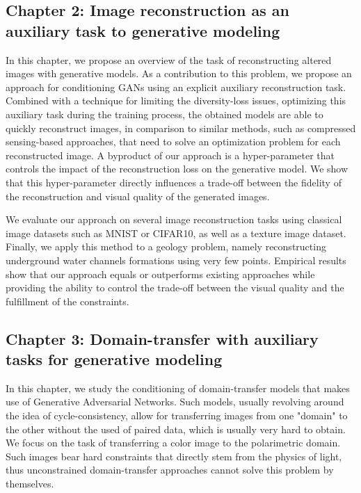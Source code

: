 \subsection*{Chapter 2: Image reconstruction as an auxiliary task to generative modeling}

In this chapter, we propose an overview of the task of reconstructing altered images with generative models. As a contribution to this problem, we propose an approach for conditioning \ac{GANs} using an explicit auxiliary reconstruction task. Combined with a technique for limiting the diversity-loss issues, optimizing this auxiliary task during the training process, the obtained models are able to quickly reconstruct images, in comparison to similar methods, such as compressed sensing-based approaches, that need to solve an optimization problem for each reconstructed image.  A byproduct of our approach is a hyper-parameter that controls the impact of the reconstruction loss on the generative model. We show that this hyper-parameter directly influences a trade-off between the fidelity of the reconstruction and visual quality of the generated images.

We evaluate our approach on several image reconstruction tasks using classical image datasets such as MNIST or CIFAR10, as well as a texture image dataset. Finally, we apply this method to a geology problem, namely reconstructing underground water channels formations using very few points. Empirical results show that our approach equals or outperforms existing approaches while providing the ability to control the trade-off between the visual quality and the fulfillment of the constraints.

\subsection*{Chapter 3: Domain-transfer with auxiliary tasks for generative modeling}

In this chapter, we study the conditioning of domain-transfer models that makes use of Generative Adversarial Networks. Such models, usually revolving around the idea of cycle-consistency, allow for transferring images from one "domain" to the other without the used of paired data, which is usually very hard to obtain. We focus on the task of transferring a color image to the polarimetric domain. Such images bear hard constraints that directly stem from the physics of light, thus unconstrained domain-transfer approaches cannot solve this problem by themselves. 

